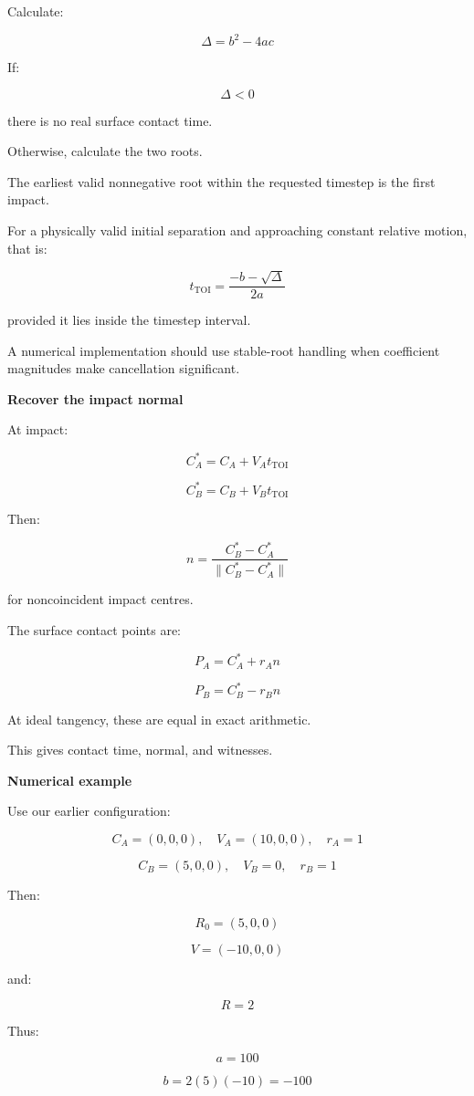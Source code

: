 Calculate:

\[
\Delta=b^2-4ac
\]

If:

\[
\Delta<0
\]

there is no real surface contact time.

Otherwise, calculate the two roots.

The earliest valid nonnegative root within the requested timestep is the first impact.

For a physically valid initial separation and approaching constant relative motion, that is:

\[
\boxed{ t_{\mathrm{TOI}}= \frac{-b-\sqrt{\Delta}}{2a} }
\]

provided it lies inside the timestep interval.

A numerical implementation should use stable-root handling when coefficient magnitudes make cancellation significant.

\textbf{Recover the impact normal}

At impact:

\[
C_A^*=C_A+V_At_{\mathrm{TOI}}
\]

\[
C_B^*=C_B+V_Bt_{\mathrm{TOI}}
\]

Then:

\[
\boxed{ n=\frac{C_B^*-C_A^*} {\|C_B^*-C_A^*\|} }
\]

for noncoincident impact centres.

The surface contact points are:

\[
\boxed{ P_A=C_A^*+r_An }
\]

\[
\boxed{ P_B=C_B^*-r_Bn }
\]

At ideal tangency, these are equal in exact arithmetic.

This gives contact time, normal, and witnesses.

\textbf{Numerical example}

Use our earlier configuration:

\[
C_A=(0,0,0),\quad V_A=(10,0,0),\quad r_A=1
\]

\[
C_B=(5,0,0),\quad V_B=0,\quad r_B=1
\]

Then:

\[
R_0=(5,0,0)
\]

\[
V=(-10,0,0)
\]

and:

\[
R=2
\]

Thus:

\[
a=100
\]

\[
b=2(5)(-10)=-100
\]

